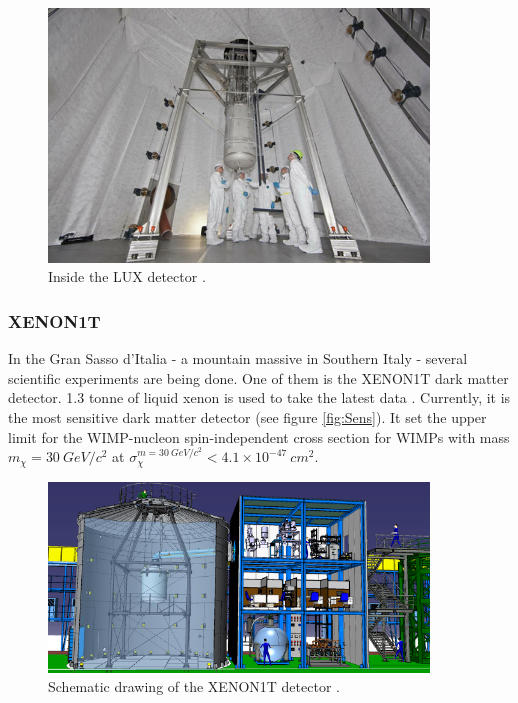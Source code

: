 \documentclass{article}
\begin{document}

\begin{figure}[h]
    \centering
    \includegraphics[width=0.9\textwidth]{lux.jpg}
    \caption{Inside the LUX detector \cite{PhysWorld}.}
    \label{fig:LUX}
\end{figure}

\subsubsection{XENON1T}
\label{sec:XENON}In the Gran Sasso d'Italia - a mountain massive in Southern Italy - several scientific experiments are being done. One of them is the XENON1T dark matter detector. 1.3 tonne of liquid xenon is used to take the latest data \cite{Aprile:2018dbl}. Currently, it is the most sensitive dark matter detector (see figure \ref{fig:Sens}). It set the upper limit for the WIMP-nucleon spin-independent cross section for WIMPs with mass $m_\chi =30\ GeV/c^2$ at $\sigma_\chi^{m=30\ GeV/c^2}<4.1\times 10^{-47}\ cm^2$.

\begin{figure}[h]
    \centering
    \includegraphics[width=0.9\textwidth]{Xenon1T.png}
    \caption{Schematic drawing of the XENON1T detector \cite{Perdue}.}
    \label{fig:XENON1T}
\end{figure}
\end{document}
